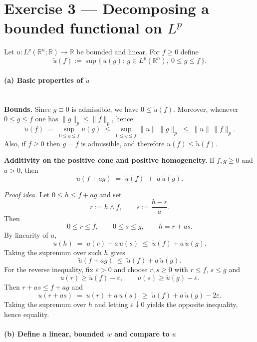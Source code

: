 \documentclass[12pt,a4paper]{article}
\theoremstyle{plain}
\theoremstyle{definition}
\theoremstyle{remark}
\theoremstyle{remark}
\theoremstyle{definition}
\begin{document}
	\section*{Exercise 3 — Decomposing a bounded functional on $L^{p}$}
	
	Let $u:L^{p}(\mathbb{R}^{n};\mathbb{R})\to\mathbb{R}$ be bounded and linear. For $f\ge0$ define
	\[
	\tilde u(f):=\sup\{\,u(g):\ g\in L^{p}(\mathbb{R}^{n}),\ 0\le g\le f\,\}.
	\]
	
\paragraph{(a) Basic properties of $\tilde u$}\mbox{}\\[1em]

\noindent\textbf{Bounds.}\quad
Since $g\equiv 0$ is admissible, we have $0 \le \tilde u(f)$.
Moreover, whenever $0 \le g \le f$ one has $\|g\|_{p} \le \|f\|_{p}$, hence
\[
\tilde u(f)
\;=\; \sup_{0 \le g \le f} u(g)
\;\le\; \sup_{0 \le g \le f} \|u\|\,\|g\|_{p}
\;\le\; \|u\|\,\|f\|_{p}.
\]
Also, if $f \ge 0$ then $g=f$ is admissible, and therefore $u(f) \le \tilde u(f)$.

\medskip

\noindent\textbf{Additivity on the positive cone and positive homogeneity.}\quad
If $f,g \ge 0$ and $a>0$, then
\[
\tilde u(f+ a g) \;=\; \tilde u(f) \;+\; a\,\tilde u(g).
\]

\noindent\emph{Proof idea.}\;
Let $0 \le h \le f + a g$ and set
\[
r := h \wedge f, \qquad s := \frac{h - r}{a}.
\]
Then
\[
0 \le r \le f, \qquad 0 \le s \le g, \qquad h = r + a s.
\]
By linearity of $u$,
\[
u(h) \;=\; u(r) + a\,u(s)
\;\le\; \tilde u(f) + a\,\tilde u(g).
\]
Taking the supremum over such $h$ gives
\[
\tilde u(f + a g) \;\le\; \tilde u(f) + a\,\tilde u(g).
\]
For the reverse inequality, fix $\varepsilon>0$ and choose $r,s \ge 0$ with
$r \le f$, $s \le g$ and
\[
u(r) \ge \tilde u(f) - \varepsilon, \qquad
u(s) \ge \tilde u(g) - \varepsilon.
\]
Then $r + a s \le f + a g$ and
\[
u(r + a s) \;=\; u(r) + a\,u(s)
\;\ge\; \tilde u(f) + a\,\tilde u(g) - 2\varepsilon.
\]
Taking the supremum over $h$ and letting $\varepsilon \downarrow 0$ yields the opposite
inequality, hence equality.

\bigskip

\paragraph{(b) Define a linear, bounded $w$ and compare to $u$}\mbox{}\\[1em]
\end{document}
